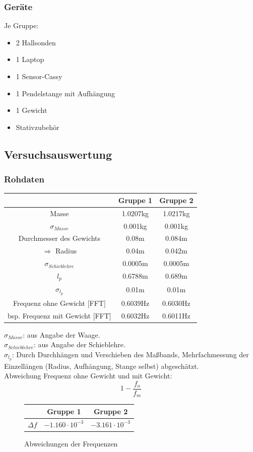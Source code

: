 \documentclass[12pt,a4paper]{article}
\begin{document}
\subsubsection{Geräte}
Je Gruppe:
\begin{itemize}
\item 2 Hallsonden
\item 1 Laptop
\item 1 Sensor-Cassy
\item 1 Pendelstange mit Aufhängung
\item 1 Gewicht
\item Stativzubehör
\end{itemize}
\subsection{Versuchsauswertung}

\subsubsection{Rohdaten}
\begin{center}
\begin{tabular}{c|c|c}
 & Gruppe 1 & Gruppe 2 \\ 
\hline
Masse & 1.0207kg & 1.0217kg \\ 
$\sigma_{Masse}$ & 0.001kg & 0.001kg \\ 
Durchmesser des Gewichts & 0.08m & 0.084m \\ 
$\Rightarrow$ Radius & 0.04m & 0.042m \\ 
$\sigma_{Schieblehre}$ & 0.0005m & 0.0005m \\ 
$l_p$ & 0.6788m & 0.689m \\ 
$\sigma_{l_p}$ & 0.01m & 0.01m \\ 
Frequenz ohne Gewicht [FFT] & 0.6039Hz & 0.6030Hz \\ 
bsp. Frequenz mit Gewicht [FFT] & 0.6032Hz & 0.6011Hz \\ 
\end{tabular} 
\end{center}
$\sigma_{Masse}$: aus Angabe der Waage.\\
$\sigma_{Schieblehre}$: aus Angabe der Schieblehre. \\
$\sigma_{l_p}$: Durch Durchhängen und Verschieben des Maßbands, Mehrfachmessung der Einzellängen (Radius, Aufhängung, Stange selbst) abgeschätzt.\\
Abweichung Frequenz ohne Gewicht und mit Gewicht:
\begin{equation}
1-\frac{f_o}{f_m}
\end{equation}
\begin{figure}[H]\centering
\begin{tabular}{c|c|c}
 & Gruppe 1 & Gruppe 2 \\ 
\hline
$\Delta f$ & $-1.160\cdot 10^{-3}$ & $-3.161\cdot 10^{-3}$ \\ 
\end{tabular} 
\caption{Abweichungen der Frequenzen}
\label{Abweichungen der Frequenzen}
\end{figure}
\newpage
\end{document}
